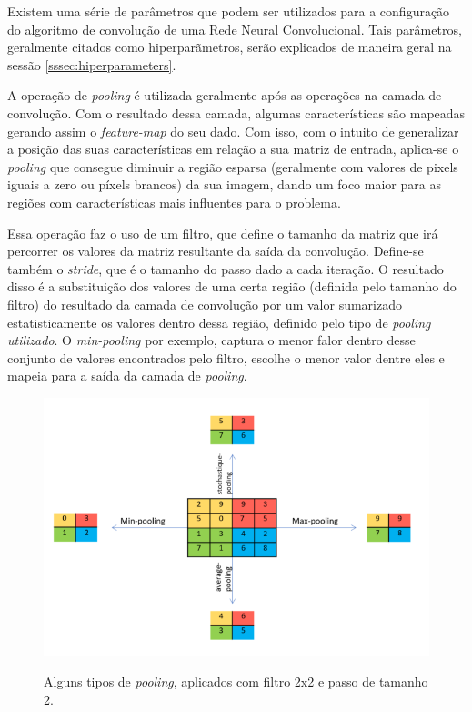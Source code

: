 Existem uma série de parâmetros que podem ser utilizados para a configuração do algoritmo de convolução de uma Rede Neural Convolucional. Tais parâmetros, geralmente citados como hiperparãmetros, serão explicados de maneira geral na sessão \ref{sssec:hiperparameters}.


 \label{ssssec:pooling}
A operação de \textit{pooling} é utilizada geralmente após as operações na camada de convolução. Com o resultado dessa camada, algumas características são mapeadas gerando assim o \textit{feature-map} do seu dado. Com isso, com o intuito de generalizar a posição das suas características em relação a sua matriz de entrada, aplica-se o \textit{pooling} que consegue diminuir a região esparsa (geralmente com valores de pixels iguais a zero ou píxels brancos) da sua imagem, dando um foco maior para as regiões com características mais influentes para o problema.

Essa operação faz o uso de um filtro, que define o tamanho da matriz que irá percorrer os valores da matriz resultante da saída da convolução. Define-se também o \textit{stride}, que é o tamanho do passo dado a cada iteração. O resultado disso é a substituição dos valores de uma certa região (definida pelo tamanho do filtro) do resultado da camada de convolução por um valor sumarizado estatisticamente os valores dentro dessa região, definido pelo tipo de \textit{pooling utilizado}. O \textit{min-pooling} por exemplo, captura o menor falor dentro desse conjunto de valores encontrados pelo filtro, escolhe o menor valor dentre eles e mapeia para a saída da camada de \textit{pooling}.


\begin{figure}[H]
  \centering
  \caption{Alguns tipos de \textit{pooling}, aplicados com filtro 2x2 e passo de tamanho 2.}
  \includegraphics[width=13cm, center]{figuras/pooling.png}
  \label{fig:pooling}
\end{figure}

